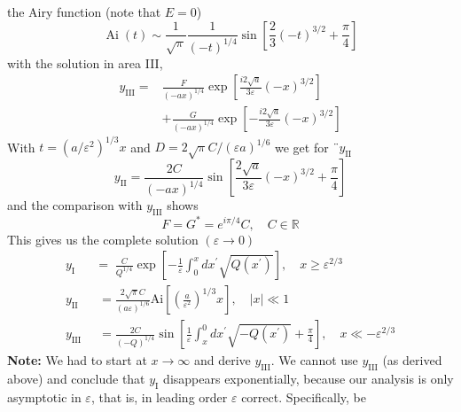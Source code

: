the Airy function (note that $E = 0$)
\begin{equation}
    \operatorname{Ai}(t) \sim \frac{1}{\sqrt{\pi}} \frac{1}{(-t)^{1 / 4}} \sin \left[\frac{2}{3}(-t)^{3 / 2}+\frac{\pi}{4}\right]
    \end{equation}
with the solution in area III,
\begin{equation}
\begin{aligned} y_{\mathrm{III}}=& \frac{F}{(-a x)^{1 / 4}} \exp \left[\frac{i 2 \sqrt{a}}{3 \varepsilon}(-x)^{3 / 2}\right] \\ &+\frac{G}{(-a x)^{1 / 4}} \exp \left[-\frac{i 2 \sqrt{a}}{3 \varepsilon}(-x)^{3 / 2}\right] \end{aligned}
\end{equation}
With $t = (a / \varepsilon^2)^{1 / 3}x$ and $D = 2\sqrt{\pi}C / (\varepsilon a)^{1/6}$ we get for $¨ y_{\text{II}}$
\begin{equation}
    y_{\mathrm{II}}=\frac{2 C}{(-a x)^{1 / 4}} \sin \left[\frac{2 \sqrt{a}}{3 \varepsilon}(-x)^{3 / 2}+\frac{\pi}{4}\right]
    \end{equation}
and the comparison with $y_{\text{III}}$ shows
\begin{equation}
    F=G^{*}=e^{i \pi / 4} C, \quad C \in \mathbb{R}
    \end{equation}
This gives us the complete solution $(\varepsilon\rightarrow 0)$
\begin{equation}
\begin{aligned} y_{\mathrm{I}} \;&=\;\frac{C}{Q^{1 / 4}} \exp \left[-\frac{1}{\varepsilon} \int_{0}^{x} d x^{\prime} \sqrt{Q\left(x^{\prime}\right)}\right], \quad x \geqslant \varepsilon^{2 / 3} \\ y_{\mathrm{II}} \;&\;=\frac{2 \sqrt{\pi} C}{(a \varepsilon)^{1 / 6}} \mathrm{A} \mathrm{i}\left[\left(\frac{a}{\varepsilon^{2}}\right)^{1 / 3} x\right], \quad|x| \ll 1 \\ y_{\mathrm{III}} \;&\;=\frac{2 C}{(-Q)^{1 / 4}} \sin \left[\frac{1}{\varepsilon} \int_{x}^{0} d x^{\prime} \sqrt{-Q\left(x^{\prime}\right)}+\frac{\pi}{4}\right], \quad x \ll-\varepsilon^{2 / 3} \end{aligned}
\end{equation}
\textbf{Note:} We had to start at $x\rightarrow\infty$ and derive $y_{\text{III}}$. We cannot use $y_{\text{III}}$ (as derived above) and conclude that $y_{\text{I}}$ disappears exponentially, because our analysis is only asymptotic in $\varepsilon$, that is, in leading order $\varepsilon$ correct. Specifically, be
